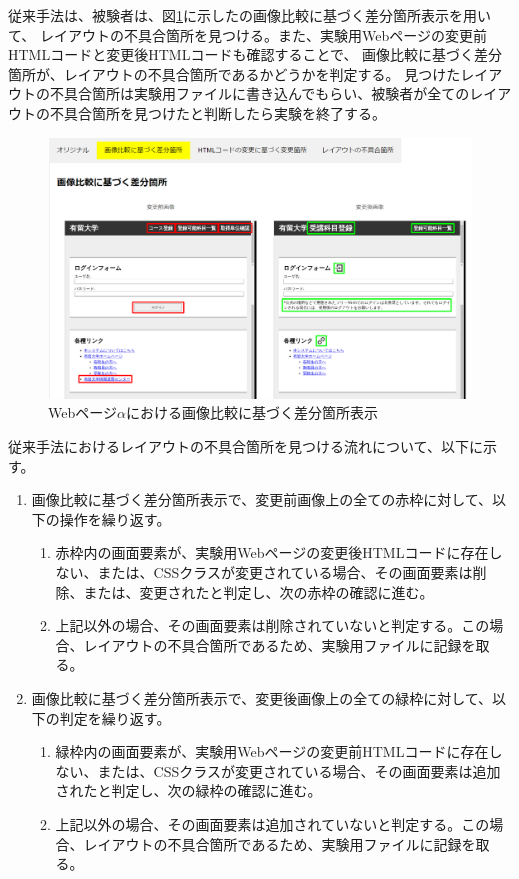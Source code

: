 従来手法は、被験者は、図\ref{fig:test1_img}に示した\toolName の画像比較に基づく差分箇所表示を用いて、
レイアウトの不具合箇所を見つける。また、実験用Webページの変更前HTMLコードと変更後HTMLコードも確認することで、
画像比較に基づく差分箇所が、レイアウトの不具合箇所であるかどうかを判定する。
見つけたレイアウトの不具合箇所は実験用ファイルに書き込んでもらい、被験者が全てのレイアウトの不具合箇所を見つけたと判断したら実験を終了する。
\begin{figure}[tp]
    \centering
    \includegraphics[width=1.0\textwidth]{image/5/new_img.png}
    \caption{Webページ$\alpha$における画像比較に基づく差分箇所表示}
    \label{fig:test1_img}
\end{figure}
従来手法におけるレイアウトの不具合箇所を見つける流れについて、以下に示す。
\begin{enumerate}
    \item 画像比較に基づく差分箇所表示で、変更前画像上の全ての赤枠に対して、以下の操作を繰り返す。
          \begin{enumerate}
              \item 赤枠内の画面要素が、実験用Webページの変更後HTMLコードに存在しない、または、CSSクラスが変更されている場合、その画面要素は削除、または、変更されたと判定し、次の赤枠の確認に進む。
              \item 上記以外の場合、その画面要素は削除されていないと判定する。この場合、レイアウトの不具合箇所であるため、実験用ファイルに記録を取る。
          \end{enumerate}
    \item 画像比較に基づく差分箇所表示で、変更後画像上の全ての緑枠に対して、以下の判定を繰り返す。
          \begin{enumerate}
              \item 緑枠内の画面要素が、実験用Webページの変更前HTMLコードに存在しない、または、CSSクラスが変更されている場合、その画面要素は追加されたと判定し、次の緑枠の確認に進む。
              \item 上記以外の場合、その画面要素は追加されていないと判定する。この場合、レイアウトの不具合箇所であるため、実験用ファイルに記録を取る。
          \end{enumerate}
\end{enumerate}


